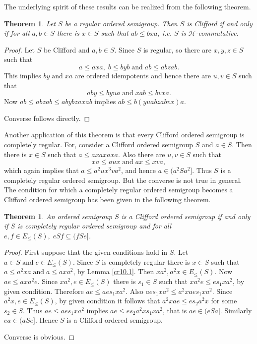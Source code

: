 \documentclass[13pt]{article}
\newtheorem{Theorem}[theorem]{Theorem}
\theoremstyle{definition}
\theoremstyle{remark}
\numberwithin{equation}{section}
\newcommand{\hc}{\mathcal{H}}
\begin{document}
The underlying spirit of these results can be realized from the
following theorem.
\begin{Theorem}\label{cr27}
Let $S$ be a regular ordered  semigroup. Then $S$ is Clifford if and
only if for all $ a, b \in S$ there is $x \in S$  such that $ab \leq
bxa$, i.e. $S$ is $\hc$-commutative.
\end{Theorem}
\begin{proof}
Let   $ S$ be Clifford and  $a, b \in S $. Since $S$ is regular, so
there are $x, y, z \in S$ such that
$$a \leq axa, \;b \leq byb \;\textrm{and} \;ab \leq abzab.$$
This implies $by \;\textrm{and}  \;xa$ are ordered  idempotents and
hence there are $u, v \in S$ such that $$aby \leq byua \;\textrm{
and} \;xab \leq bvxa.$$ Now  $ab \leq abzab \leq aby bza xab$
implies $ab \leq b(yua bza bvx)a$.

Converse follows directly.
\end{proof}
Another application of this theorem is that every Clifford ordered
semigroup is completely regular. For, consider a Clifford ordered
semigroup $S$ and $a \in S$. Then there is  $x \in S$ such that $a
\leq axa xa xa$. Also there are $u, v \in S$ such that $$xa \leq aux
\;\textrm{and} \;ax \leq xva,$$ which again implies that $ a \leq
a^2ux^3 va^2$, and hence   $a \in  (a^2 S a^2]$. Thus $S$ is a
completely regular ordered semigroup.  But the converse is not true
in general. The condition for which a completely regular ordered
semigroup becomes a Clifford ordered semigroup has been given in the
following theorem.
\begin{Theorem}\label{cr29}
An  ordered semigroup $S$ is a  Clifford ordered semigroup if and
only if  $S$ is completely regular ordered semigroup and  for all
$e, f \in E_\leq (S), \;eSf \subseteq (f S e]$.
\end{Theorem}
\begin{proof}
First suppose  that the  given conditions hold in  $S$. Let $a \in S
\;\textrm{and} \;e \in E_\leq(S)$. Since $S$ is completely regular
there is $x \in S$ such that $a \leq a^2xa \;\textrm{and} \;a \leq
axa^2$, by Lemma \ref{cr10.1}. Then $xa^2, a^2x \in E_\leq (S)$. Now
$ae \leq axa^2e$. Since $xa^2, e \in E_\leq (S)$ there is $s_1 \in
S$ such that $xa^2e \leq es_1xa^2$, by given condition. Therefore
$ae \leq aes_1 xa^2$. Also $aes_1xa^2 \leq a^2xa es_1xa^2$. Since
$a^2x, e \in E_\leq (S)$, by given condition it follows that $a^2xae
\leq es_2a^2x$ for some $s_2 \in S$. Thus $ae \leq aes_1 xa^2$
implies $ae \leq es_2a^2x s_1xa^2$, that is $ae \in (eSa]$.
Similarly $ea \in (aSe]$. Hence $S$ is a Clifford ordered semigroup.

Converse is obvious.
\end{proof}
\end{document}

